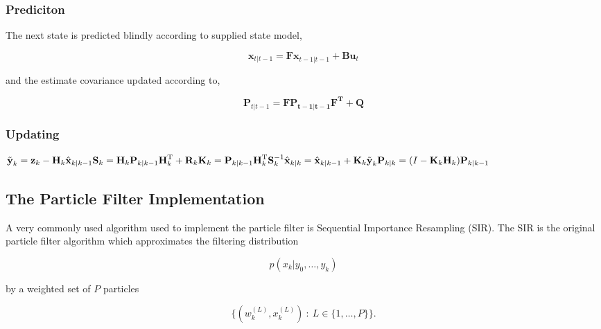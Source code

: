 \subsubsection{Prediciton}
The next state is predicted blindly according to supplied state model,

\begin{equation}
\mathbf{x}_{t|t-1} = \mathbf{Fx}_{t-1|t-1} + \mathbf{Bu}_{t}
\end{equation}

and the estimate covariance updated according to,

\begin{equation}
\mathbf{P}_{t|t-1} = \mathbf{FP_{t-1|t-1}F^{T}} + \mathbf{Q}
\end{equation}

\subsubsection{Updating}

\begin{math}
\tilde{\textbf{y}}_k = \textbf{z}_k - \textbf{H}_k\hat{\textbf{x}}_{k|k-1}\\
\textbf{S}_k = \textbf{H}_k \textbf{P}_{k|k-1} \textbf{H}_k^\text{T} + \textbf{R}_k\\
\textbf{K}_k = \textbf{P}_{k|k-1}\textbf{H}_k^\text{T}\textbf{S}_k^{-1}\\
\hat{\textbf{x}}_{k|k} = \hat{\textbf{x}}_{k|k-1} + \textbf{K}_k\tilde{\textbf{y}}_k\\
\textbf{P}_{k|k} = (I - \textbf{K}_k \textbf{H}_k) \textbf{P}_{k|k-1}
\end{math}

\subsection{The Particle Filter Implementation}

A very commonly used algorithm used to implement the particle filter is
Sequential Importance Resampling (SIR). The SIR is the original particle filter
algorithm which approximates the filtering distribution 

\begin{equation}
p(x_k|y_0,\ldots,y_k)
\end{equation}

by a weighted set of $P$ particles

\begin{equation}
\{(w^{(L)}_k,x^{(L)}_k)~:~L\in\{1,\ldots,P\}\}.
\end{equation}

